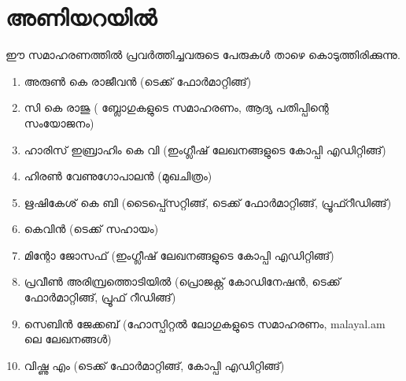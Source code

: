 \section*{അണിയറയില്‍}

ഈ സമാഹരണത്തില്‍ പ്രവര്‍ത്തിച്ചവരുടെ പേരുകള്‍ താഴെ കൊടുത്തിരിക്കുന്നു. 

\begin{enumerate}
 \item അരുണ്‍ കെ രാജീവന്‍ (ടെക്ക് ഫോര്‍മാറ്റിങ്ങ്)
 \item സി കെ രാജു ( ബ്ലോഗുകളുടെ സമാഹരണം, ആദ്യ പതിപ്പിന്റെ സംയോജനം)
 \item ഹാരിസ് ഇബ്രാഹിം  കെ വി  (ഇംഗ്ലീഷ് ലേഖനങ്ങളുടെ കോപ്പി എഡിറ്റിങ്ങ്)
 \item ഹിരണ്‍ വേണുഗോപാലന്‍ (മുഖചിത്രം)
 \item ഋഷികേശ് കെ ബി (ടൈപ്പ്സെറ്റിങ്ങ്, ടെക്ക് ഫോര്‍മാറ്റിങ്ങ്, പ്രൂഫ്റീഡിങ്ങ്) 
 \item കെവിന്‍ (ടെക്ക് സഹായം)
 \item മിന്റോ ജോസഫ് (ഇംഗ്ലീഷ് ലേഖനങ്ങളുടെ കോപ്പി എഡിറ്റിങ്ങ്)
 \item പ്രവീണ്‍ അരിമ്പ്രത്തൊടിയില്‍ (പ്രൊജക്റ്റ് കോഡിനേഷന്‍, ടെക്ക് ഫോര്‍മാറ്റിങ്ങ്, പ്രൂഫ് റീഡിങ്ങ്)
 \item സെബിന്‍ ജേക്കബ് (ഹോസ്പിറ്റല്‍ ലോഗുകളുടെ സമാഹരണം, malayal.am ലെ ലേഖനങ്ങള്‍)
 \item വിഷ്ണു എം (ടെക്ക് ഫോര്‍മാറ്റിങ്ങ്, കോപ്പി എഡിറ്റിങ്ങ്)
\end{enumerate}

\newpage

